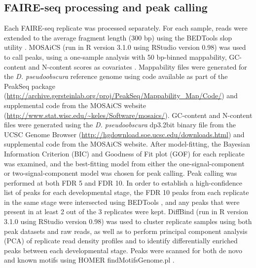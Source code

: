 \subsection{FAIRE-seq processing and peak calling}
Each FAIRE-seq replicate was processed separately. For each sample, reads were extended to the average fragment length (300 bp) using the BEDTools slop utility \citep{quinlan_bedtools:_2010}. MOSAiCS (run in R version 3.1.0 using RStudio version 0.98) was used to call peaks, using a one-sample analysis with 50 bp-binned mappability, GC-content and N-content scores as covariates \citep{chung_mosaics_2012}. Mappability files were generated for the \emph{D. pseudoobscura} reference genome using code available as part of the PeakSeq package (\url{http://archive.gersteinlab.org/proj/PeakSeq/Mappability_Map/Code/}) \citep{rozowsky_peakseq_2009} and supplemental code from the MOSAiCS website (\url{http://www.stat.wisc.edu/~keles/Software/mosaics/}). GC-content and N-content files were generated using the \emph{D. pseudoobscura} dp3.2bit binary file from the UCSC Genome Browser (\url{http://hgdownload.soe.ucsc.edu/downloads.html}) and supplemental code from the MOSAiCS website. After model-fitting, the Bayesian Information Criterion (BIC) and Goodness of Fit plot (GOF) for each replicate was examined, and the best-fitting model from either the one-signal-component or two-signal-component model was chosen for peak calling. Peak calling was performed at both FDR 5 and FDR 10. In order to establish a high-confidence list of peaks for each developmental stage, the FDR 10 peaks from each replicate in the same stage were intersected using BEDTools \citep{quinlan_bedtools:_2010}, and any peaks that were present in at least 2 out of the 3 replicates were kept. DiffBind (run in R version 3.1.0 using RStudio version 0.98) was used to cluster replicate samples using both peak datasets and raw reads, as well as to perform principal component analysis (PCA) of replicate read density profiles and to identify differentially enriched peaks between each developmental stage. Peaks were scanned for both de novo and known motifs using HOMER findMotifsGenome.pl \citep{heinz_simple_2010}.\\

